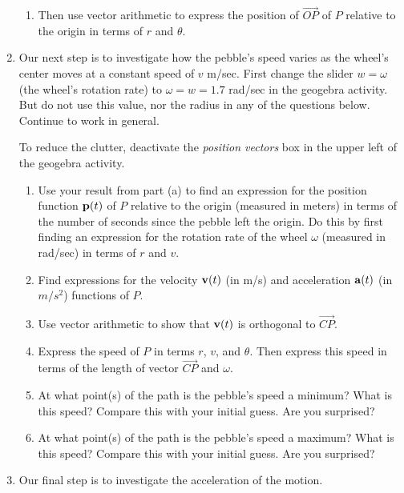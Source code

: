 \documentclass{ximera}
\begin{document}
\begin{question}
\begin{enumerate}
\begin{enumerate}
\item Then use vector arithmetic to express the position of $\overrightarrow{OP}$ of $P$ relative to the origin in terms of $r$ and $\theta$.
\end{enumerate}

\item Our next step is to investigate how the pebble's speed varies as the wheel's center moves at a constant speed of $v$ m/sec.
First change the slider $w = \omega$ (the wheel's rotation rate) to $\omega = w = 1.7$ rad/sec in the geogebra activity. But do not use this value, nor the radius in any of the questions below. Continue to work in general.

To reduce the clutter, deactivate the \emph{position vectors} box in the upper left of the geogebra activity.

\begin{enumerate}
\item Use your result from part (a) to find an expression for the position function ${\bf p}(t)$ of $P$ relative to the origin (measured in meters) in terms of the number of seconds since the pebble left the origin. Do this by first finding an expression for the rotation rate of the wheel $\omega$ (measured in rad/sec) in terms of $r$ and $v$.

\item Find expressions for the velocity ${\bf v}(t)$ (in m/s) and acceleration ${\bf a}(t)$ (in $m/s^2$) functions of $P$.

\item Use vector arithmetic to show that ${\bf v}(t)$ is orthogonal to $\overrightarrow{ CP}$.

\item Express the speed of $P$ in terms $r$, $v$, and $\theta$. Then express this speed in terms of the length of vector $\overrightarrow{CP}$ and $\omega$.

\item At what point(s) of the path is the pebble's speed a minimum? What is this speed? Compare this with your initial guess. Are you surprised?
 
\item At what point(s) of the path is the pebble's speed a maximum? What is this speed? Compare this with your initial guess. Are you surprised?

\end{enumerate}

\item Our final step is to investigate the acceleration of the motion.


\end{enumerate}
\end{question}
\end{document}
